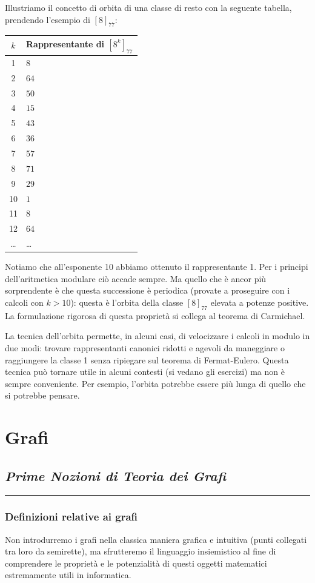 \documentclass[oneside]{book}
\theoremstyle{remark}
\newcommand{\chptr}[1]{\chapter{\textit{#1}}\noindent\rule{\textwidth}{1pt}}
\newcommand{\head}[1]{\textnormal{\textbf{#1}}} %
\begin{document}
Illustriamo il concetto di orbita di una classe di resto con la seguente tabella,
prendendo l'esempio di $[8]_{77}$:
\begin{center}
\begin{tabular}{c|l}
    \head{$k$} & \head{Rappresentante di $[8^k]_{77}$}\\
    \hline
    1        & $8$\\
    2        & $64$\\
    3        & $50$\\
    4        & $15$\\
    5        & $43$\\
    6        & $36$\\
    7        & $57$\\
    8        & $71$\\
    9        & $29$\\
    10       & $1$\\
    11       & $8$\\
    12       & $64$\\
    \dots    & \dots
\end{tabular}
\end{center}
Notiamo che all'esponente 10 abbiamo ottenuto il rappresentante
1. Per i principi dell'aritmetica modulare ciò accade sempre. Ma
quello che è ancor più sorprendente è che questa successione è periodica
(provate a proseguire con i calcoli con $k>10$): questa è l'orbita
della classe $[8]_{77}$ elevata a potenze positive. La formulazione
rigorosa di questa proprietà si collega al teorema di Carmichael.

La tecnica dell'orbita permette, in alcuni casi, di velocizzare i calcoli in
modulo in due modi: trovare rappresentanti canonici ridotti e agevoli
da maneggiare o raggiungere la classe 1 senza ripiegare sul teorema
di Fermat-Eulero. Questa tecnica può tornare utile in alcuni
contesti (si vedano gli esercizi) ma non è sempre conveniente. Per esempio,
l'orbita potrebbe essere più lunga di quello che si potrebbe pensare.




\part{Grafi}
\chptr{Prime Nozioni di Teoria dei Grafi}

\section{Definizioni relative ai grafi}
Non introdurremo i grafi nella classica maniera grafica e intuitiva (punti collegati
tra loro da semirette), ma sfrutteremo il linguaggio insiemistico al fine
di comprendere le proprietà e le potenzialità di questi oggetti matematici estremamente
utili in informatica.
\end{document}
